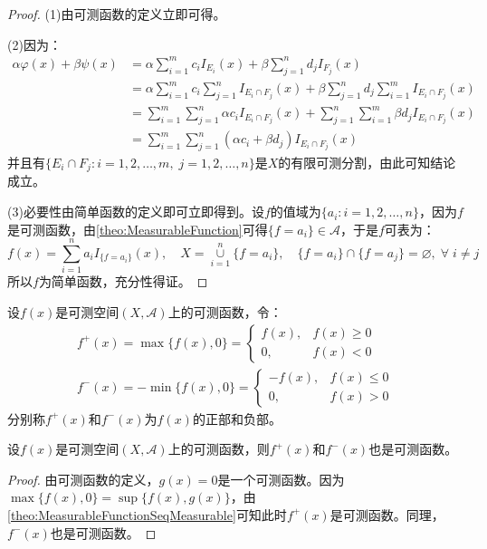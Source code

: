 \begin{proof}
	(1)由可测函数的定义立即可得。\par
	(2)因为：
	\begin{align*}
		\alpha\varphi(x)+\beta\psi(x)
		&=\alpha\sum_{i=1}^{m}c_iI_{E_i}(x)+\beta\sum_{j=1}^{n}d_jI_{F_j}(x) \\
		&=\alpha\sum_{i=1}^{m}c_i\sum_{j=1}^{n}I_{E_i\cap F_j}(x)+\beta\sum_{j=1}^{n}d_j\sum_{i=1}^{m}I_{E_i\cap F_j}(x) \\
		&=\sum_{i=1}^{m}\sum_{j=1}^{n}\alpha c_iI_{E_i\cap F_j}(x)+\sum_{j=1}^{n}\sum_{i=1}^{m}\beta d_jI_{E_i\cap F_j}(x) \\
		&=\sum_{i=1}^{m}\sum_{j=1}^{n}(\alpha c_i+\beta d_j)I_{E_i\cap F_j}(x)
	\end{align*}
	并且有$\{E_i\cap F_j:i=1,2,\dots,m,\;j=1,2,\dots,n\}$是$X$的有限可测分割，由此可知结论成立。\par
	(3)必要性由简单函数的定义即可立即得到。设$f$的值域为$\{a_i:i=1,2,\dots,n\}$，因为$f$是可测函数，由\cref{theo:MeasurableFunction}可得$\{f=a_i\}\in\mathscr{A}$，于是$f$可表为：
	\begin{equation*}
		f(x)=\sum_{i=1}^{n}a_iI_{\{f=a_i\}}(x),\quad X=\underset{i=1}{\overset{n}{\cup}}\{f=a_i\},\quad\{f=a_i\}\cap\{f=a_j\}=\varnothing,\;\forall\;i\ne j
	\end{equation*}
	所以$f$为简单函数，充分性得证。
\end{proof}
\begin{definition}
	设$f(x)$是可测空间$(X,\mathscr{A})$上的可测函数，令：
	\begin{gather*}
		f^+(x)=\max\{f(x),0\}=
		\begin{cases}
			f(x),&f(x)\geqslant 0 \\
			0,&f(x)<0
		\end{cases} \\
		f^-(x)=-\min\{f(x),0\}=
		\begin{cases}
			-f(x),&f(x)\leqslant 0 \\
			0,&f(x)>0
		\end{cases}
	\end{gather*}
	分别称$f^+(x)$和$f^-(x)$为$f(x)$的正部和负部。
\end{definition}
\begin{theorem}\label{theo:Measurablef^+f^-}
	设$f(x)$是可测空间$(X,\mathscr{A})$上的可测函数，则$f^+(x)$和$f^-(x)$也是可测函数。
\end{theorem}
\begin{proof}
	由可测函数的定义，$g(x)=0$是一个可测函数。因为$\max\{f(x),0\}=\sup\{f(x),g(x)\}$，由\cref{theo:MeasurableFunctionSeqMeasurable}可知此时$f^+(x)$是可测函数。同理，$f^-(x)$也是可测函数。
\end{proof}
